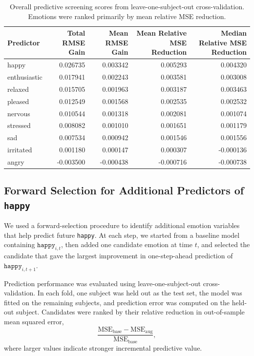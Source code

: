 \documentclass[12pt,letterpaper,fleqn]{article}
\begin{document}
\begin{table}[htbp]
\centering
\scriptsize
\caption{Overall predictive screening scores from leave-one-subject-out cross-validation. Emotions were ranked primarily by mean relative MSE reduction.}
\label{tab:overall_scores}
\begin{tabular}{lrrrr}
\hline
Predictor & Total RMSE Gain & Mean RMSE Gain & Mean Relative MSE Reduction & Median Relative MSE Reduction \\
\hline
happy        & 0.026735 & 0.003342 & 0.005293 & 0.004320 \\
enthusiastic & 0.017941 & 0.002243 & 0.003581 & 0.003008 \\
relaxed      & 0.015705 & 0.001963 & 0.003187 & 0.003463 \\
pleased      & 0.012549 & 0.001568 & 0.002535 & 0.002532 \\
nervous      & 0.010544 & 0.001318 & 0.002081 & 0.001074 \\
stressed     & 0.008082 & 0.001010 & 0.001651 & 0.001179 \\
sad          & 0.007534 & 0.000942 & 0.001546 & 0.001556 \\
irritated    & 0.001180 & 0.000147 & 0.000307 & -0.000136 \\
angry        & -0.003500 & -0.000438 & -0.000716 & -0.000738 \\
\hline
\end{tabular}
\end{table}


\subsection{Forward Selection for Additional Predictors of \texttt{happy}}
\label{app:forward_selection_happy}

We used a forward-selection procedure to identify additional emotion variables that help predict future \texttt{happy}. At each step, we started from a baseline model containing \(\texttt{happy}_{i,t}\), then added one candidate emotion at time \(t\), and selected the candidate that gave the largest improvement in one-step-ahead prediction of \(\texttt{happy}_{i,t+1}\).

Prediction performance was evaluated using leave-one-subject-out cross-validation. In each fold, one subject was held out as the test set, the model was fitted on the remaining subjects, and prediction error was computed on the held-out subject. Candidates were ranked by their relative reduction in out-of-sample mean squared error,
\[
\frac{\mathrm{MSE}_{\text{base}}-\mathrm{MSE}_{\text{aug}}}{\mathrm{MSE}_{\text{base}}},
\]
where larger values indicate stronger incremental predictive value.
\end{document}
